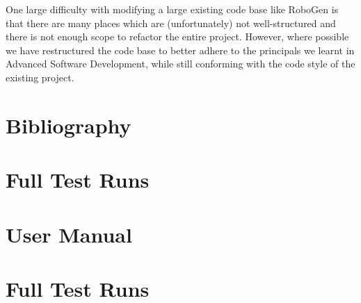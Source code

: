 \documentclass[11pt,a4paper]{article}
\begin{document}
One large difficulty with modifying a large existing code base like RoboGen is
that there are many places which are (unfortunately) not well-structured and
there is not enough scope to refactor the entire project. However, where
possible we have restructured the code base to better adhere to the principals
we learnt in Advanced Software Development, while still conforming with the
code style of the existing project.

\section{Bibliography}
\printbibliography

\appendix

\section{Full Test Runs}
\label{s:full-test-runs}


\section{User Manual}
\label{s:user-manual}

\section{Full Test Runs}
\label{s:full-test-runs}

\end{document}
